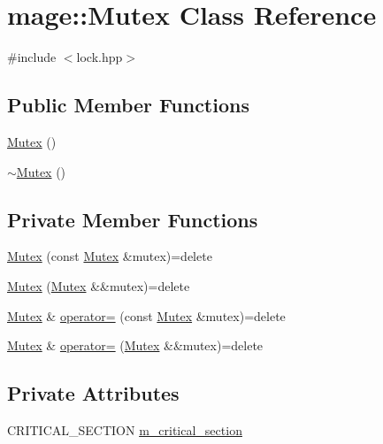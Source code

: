 \hypertarget{classmage_1_1_mutex}{}\section{mage\+:\+:Mutex Class Reference}
\label{classmage_1_1_mutex}


{\ttfamily \#include $<$lock.\+hpp$>$}

\subsection*{Public Member Functions}
\begin{DoxyCompactItemize}
\item 
\hyperlink{classmage_1_1_mutex_ab22db01311271ef54642b10ea53dfd8a}{Mutex} ()
\item 
\hyperlink{classmage_1_1_mutex_a143d82ec7bb43f953a1703caa7972e9d}{$\sim$\+Mutex} ()
\end{DoxyCompactItemize}
\subsection*{Private Member Functions}
\begin{DoxyCompactItemize}
\item 
\hyperlink{classmage_1_1_mutex_af1c2c7d0134ba853903522d2f3684f22}{Mutex} (const \hyperlink{classmage_1_1_mutex}{Mutex} \&mutex)=delete
\item 
\hyperlink{classmage_1_1_mutex_a4ec1fd645bcea634f957552d1dfa3565}{Mutex} (\hyperlink{classmage_1_1_mutex}{Mutex} \&\&mutex)=delete
\item 
\hyperlink{classmage_1_1_mutex}{Mutex} \& \hyperlink{classmage_1_1_mutex_a56072bdabdeadd5d897de232dbd298a0}{operator=} (const \hyperlink{classmage_1_1_mutex}{Mutex} \&mutex)=delete
\item 
\hyperlink{classmage_1_1_mutex}{Mutex} \& \hyperlink{classmage_1_1_mutex_aaef0078f5b70afb0e5a290a5b5f33680}{operator=} (\hyperlink{classmage_1_1_mutex}{Mutex} \&\&mutex)=delete
\end{DoxyCompactItemize}
\subsection*{Private Attributes}
\begin{DoxyCompactItemize}
\item 
C\+R\+I\+T\+I\+C\+A\+L\+\_\+\+S\+E\+C\+T\+I\+ON \hyperlink{classmage_1_1_mutex_a18414337aef28b7ed261e7a805d2c103}{m\+\_\+critical\+\_\+section}
\end{DoxyCompactItemize}
